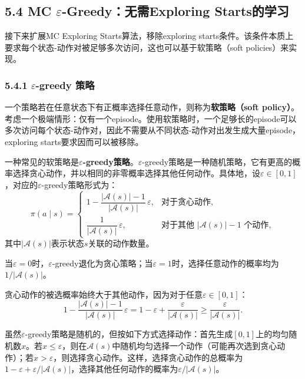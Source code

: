 \documentclass[UTF8]{article}
\begin{document}
\subsection*{5.4 MC $\varepsilon$-Greedy：无需Exploring Starts的学习}

接下来扩展MC Exploring Starts算法，移除exploring starts条件。该条件本质上要求每个状态-动作对被足够多次访问，这也可以基于软策略（soft policies）来实现。

\subsubsection*{5.4.1 $\varepsilon$-greedy 策略}

一个策略若在任意状态下有正概率选择任意动作，则称为\textbf{软策略（soft policy）}。考虑一个极端情形：仅有一个episode。使用软策略时，一个足够长的episode可以多次访问每个状态-动作对，因此不需要从不同状态-动作对出发生成大量episode，exploring starts要求因而可以被移除。

一种常见的软策略是\textbf{$\varepsilon$-greedy策略}。$\varepsilon$-greedy策略是一种随机策略，它有更高的概率选择贪心动作，并以相同的非零概率选择其他任何动作。具体地，设$\varepsilon \in [0,1]$，对应的$\varepsilon$-greedy策略形式为：
\begin{equation}
\label{eq:egreedy}
\pi(a \mid s) =
\begin{cases}
1 - \dfrac{|\mathcal{A}(s)| - 1}{|\mathcal{A}(s)|} \,\varepsilon, & \text{对于贪心动作}, \\[10pt]
\dfrac{1}{|\mathcal{A}(s)|} \,\varepsilon, & \text{对于其他 $|\mathcal{A}(s)| - 1$ 个动作},
\end{cases}
\end{equation}
其中$|\mathcal{A}(s)|$表示状态$s$关联的动作数量。

当$\varepsilon = 0$时，$\varepsilon$-greedy退化为贪心策略；当$\varepsilon = 1$时，选择任意动作的概率均为$1/|\mathcal{A}(s)|$。

贪心动作的被选概率始终大于其他动作，因为对于任意$\varepsilon \in [0,1]$：
\[
1 - \frac{|\mathcal{A}(s)| - 1}{|\mathcal{A}(s)|} \,\varepsilon = 1 - \varepsilon + \frac{\varepsilon}{|\mathcal{A}(s)|} \geq \frac{\varepsilon}{|\mathcal{A}(s)|}.
\]

虽然$\varepsilon$-greedy策略是随机的，但按如下方式选择动作：首先生成$[0,1]$上的均匀随机数$x$。若$x \leq \varepsilon$，则在$\mathcal{A}(s)$中随机均匀选择一个动作（可能再次选到贪心动作）；若$x > \varepsilon$，则选择贪心动作。这样，选择贪心动作的总概率为$1 - \varepsilon + \varepsilon / |\mathcal{A}(s)|$，选择其他任何动作的概率为$\varepsilon / |\mathcal{A}(s)|$。
\end{document}
